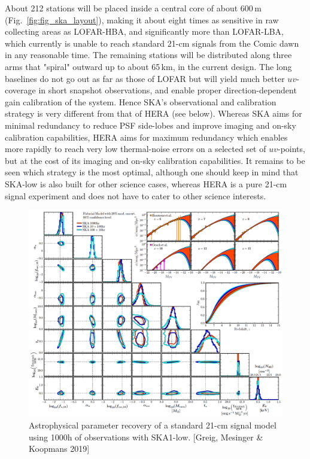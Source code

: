 %
About 212 stations will be placed inside a central core of about 600\,m (Fig.~\ref{fig:fig_ska_layout}), making it about eight times as sensitive in raw collecting areas as LOFAR-HBA, and significantly more than LOFAR-LBA, which currently is unable to reach standard 21-cm signals from the Comic dawn in any reasonable time. The remaining stations will be distributed along three arms that "spiral" outward up to about 65\,km, in the current design.  The long baselines do not go out as far as those of LOFAR but will yield much better $uv$-coverage in short snapshot observations, and enable proper direction-dependent gain calibration of the system. Hence SKA's observational and calibration strategy is very different from that of  HERA (see below). Whereas SKA aims for minimal redundancy to reduce PSF side-lobes and improve imaging and on-sky calibration capabilities, HERA aims for maximum redundancy which enables more rapidly to reach very low thermal-noise errors on a selected set of $uv$-points, but at the cost of its imaging and on-sky calibration capabilities. It remains to be seen which strategy is the most optimal, although one should keep in mind that SKA-low is also built for other science cases, whereas HERA is a pure 21-cm signal experiment and does not have to cater to other science interests. 
%
\begin{figure}[]
\begin{center}
\includegraphics[width=\textwidth]{Koopmans_Bernardi/SKA-astrophysics.png}
\end{center}
\caption{Astrophysical parameter recovery of a standard 21-cm signal model using 1000h of observations with SKA1-low. [Greig, Mesinger & Koopmans 2019]}
\label{fig:fig_ska_astroph}
\end{figure}
